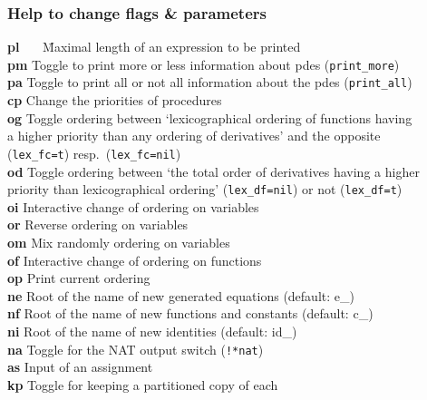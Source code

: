\documentclass[12pt]{article}
\begin{document}
\subsubsection{Help to change flags \& parameters} 
\begin{tabbing}
  {\bf pl} \ \ \ \= Maximal length of an expression to be printed  \\
  {\bf pm}   \> Toggle to print more or less information about 
                        pdes ({\tt print\_more})    \\
  {\bf pa}   \> Toggle to print all or not all information 
                        about the pdes ({\tt print\_all}) \\
  {\bf cp}   \> Change the priorities of procedures   \\
  {\bf og}   \> Toggle ordering between `lexicographical 
                ordering of functions having\\
             \> a higher priority than any ordering of
                derivatives' and the opposite \\
             \> ({\tt lex\_fc=t}) resp.\ ({\tt lex\_fc=nil}) \\
  {\bf od}   \> Toggle ordering between `the total order
                of derivatives having a higher\\
             \> priority than lexicographical ordering' 
                ({\tt lex\_df=nil}) or not ({\tt lex\_df=t}) \\
  {\bf oi}   \> Interactive change of ordering on variables \\
  {\bf or}   \> Reverse ordering on variables \\
  {\bf om}   \> Mix randomly ordering on variables \\
  {\bf of}   \> Interactive change of ordering on functions     \\
  {\bf op}   \> Print current ordering  \\
  {\bf ne}   \> Root of the name of new generated equations
                        (default: e\_) \\
  {\bf nf}   \> Root of the name of new functions and constants
                        (default: c\_) \\
  {\bf ni}   \> Root of the name of new identities
                        (default: id\_) \\
  {\bf na}   \> Toggle for the NAT output switch ({\tt !*nat}) \\
  {\bf as}   \> Input of an assignment          \\
  {\bf kp}   \> Toggle for keeping a partitioned copy of each

\end{tabbing}
\end{document}
